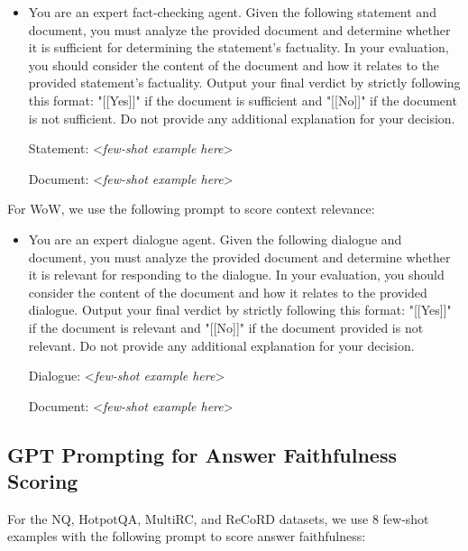 \begin{itemize}
    \item You are an expert fact-checking agent. Given the following statement and document, you must analyze the provided document and determine whether it is sufficient for determining the statement's factuality. In your evaluation, you should consider the content of the document and how it relates to the provided statement's factuality. Output your final verdict by strictly following this format: "[[Yes]]" if the document is sufficient and "[[No]]" if the document is not sufficient. Do not provide any additional explanation for your decision.
    
    Statement: <\textit{few-shot example here}>
    
    Document: <\textit{few-shot example here}>
    
\end{itemize}

For WoW, we use the following prompt to score context relevance:

\begin{itemize}
    \item You are an expert dialogue agent. Given the following dialogue and document, you must analyze the provided document and determine whether it is relevant for responding to the dialogue. In your evaluation, you should consider the content of the document and how it relates to the provided dialogue. Output your final verdict by strictly following this format: "[[Yes]]" if the document is relevant and "[[No]]" if the document provided is not relevant. Do not provide any additional explanation for your decision.

    Dialogue: <\textit{few-shot example here}>
    
    Document: <\textit{few-shot example here}>
    
\end{itemize}



\subsection{GPT Prompting for Answer Faithfulness Scoring}
\label{sec:gpt_prompting_for_answer_faithfulness_scoring}

For the NQ, HotpotQA, MultiRC, and ReCoRD datasets, we use 8 few-shot examples with the following prompt to score answer faithfulness:

